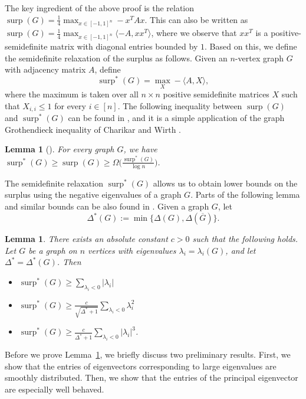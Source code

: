 \documentclass[11pt]{article}
\theoremstyle{plain}
\newtheorem{lemma}[theorem]{Lemma}
\theoremstyle{definition}
\DeclareMathOperator{\surp}{surp}
\begin{document}
The key ingredient of the above proof is the relation $\surp(G)=\frac{1}{4}\max_{x\in [-1,1]^n}-x^T Ax$.
This can also be written as $\surp(G)=\frac{1}{4}\max_{x\in [-1, 1]^n}\langle -A, xx^T\rangle$, where we observe that $xx^T$ is a positive-semidefinite matrix with diagonal entries bounded by $1$. Based on this, we define the semidefinite relaxation of the surplus as follows. Given an $n$-vertex graph $G$ with adjacency matrix $A$, define $$\surp^*(G)=\max_{X} -\langle A,X\rangle,$$ where the maximum is taken over all $n\times n$ positive semidefinite matrices $X$ such that $X_{i,i}\leq 1$ for every $i\in [n]$. The following inequality between $\surp(G)$ and $\surp^*(G)$ can be found in \cite{RT}, and it is a simple application of the graph Grothendieck inequality of Charikar and Wirth \cite{CW04}. 

\begin{lemma}[\cite{RT}]\label{claim:groth}
For every graph $G$, we have $\surp^*(G)\geq \surp(G)\geq \Omega\Big(\frac{\surp^*(G)}{\log n}\Big)$.
\end{lemma}

The semidefinite relaxation $\surp^*(G)$ allows us to obtain lower bounds on the surplus using the negative eigenvalues of a graph $G$.  Parts of the following lemma and similar bounds can be also found in \cite{RST,RT}. Given a graph $G$, let 
$$\Delta^*(G):=\min\{\Delta(G),\Delta(\overline{G})\}.$$

\begin{lemma}\label{lemma:surp_star}
There exists an absolute constant $c>0$ such that the following holds. Let $G$ be a graph on $n$ vertices with eigenvalues $\lambda_i=\lambda_i(G)$, and let $\Delta^*=\Delta^*(G)$. Then
\begin{itemize}
    \item[(i)] $\surp^*(G)\geq \displaystyle\sum_{\lambda_i<0}|\lambda_i|$
    \item[(ii)] $\surp^*(G)\geq\frac{c}{\sqrt{\Delta^*+1}}\displaystyle\sum_{\lambda_i<0}\lambda_i^2$
    \item[(iii)]  $\surp^*(G)\geq \frac{c}{\Delta^*+1}\displaystyle\sum_{\lambda_i<0}|\lambda_i|^3$.
\end{itemize}
\end{lemma}

Before we prove Lemma~\ref{lemma:surp_star}, we briefly discuss  two preliminary results. First, we show that the entries of eigenvectors corresponding to large eigenvalues are smoothly distributed. Then, we show that the entries of the principal eigenvector are especially well behaved.
\end{document}
